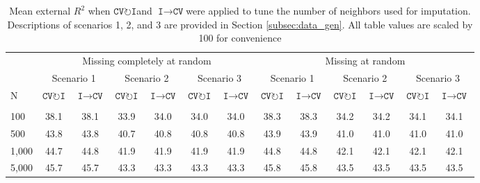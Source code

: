 \documentclass[AMA,STIX1COL,doublespace]{WileyNJD-v2}
\begin{document}
\begin{table}

\caption{\label{tab:tune}Mean external $R^2$ when $\texttt{CV}\!\circlearrowright\!\texttt{I}$\space and $\texttt{I}\!\!\rightarrow\!\texttt{CV}$\space were applied to tune the number of neighbors used for imputation. Descriptions of scenarios 1, 2, and 3 are provided in Section \ref{subsec:data_gen}. All table values are scaled by 100 for convenience}
\centering
\begin{tabular}[t]{lcccccccccccc}
\toprule
\multicolumn{1}{c}{ } & \multicolumn{6}{c}{Missing completely at random} & \multicolumn{6}{c}{Missing at random} \\
\cmidrule(l{3pt}r{3pt}){2-7} \cmidrule(l{3pt}r{3pt}){8-13}
\multicolumn{1}{c}{ } & \multicolumn{2}{c}{Scenario 1} & \multicolumn{2}{c}{Scenario 2} & \multicolumn{2}{c}{Scenario 3} & \multicolumn{2}{c}{Scenario 1} & \multicolumn{2}{c}{Scenario 2} & \multicolumn{2}{c}{Scenario 3} \\
\cmidrule(l{3pt}r{3pt}){2-3} \cmidrule(l{3pt}r{3pt}){4-5} \cmidrule(l{3pt}r{3pt}){6-7} \cmidrule(l{3pt}r{3pt}){8-9} \cmidrule(l{3pt}r{3pt}){10-11} \cmidrule(l{3pt}r{3pt}){12-13}
N & $\texttt{CV}\!\circlearrowright\!\texttt{I}$& $\texttt{I}\!\!\rightarrow\!\texttt{CV}$& $\texttt{CV}\!\circlearrowright\!\texttt{I}$& $\texttt{I}\!\!\rightarrow\!\texttt{CV}$& $\texttt{CV}\!\circlearrowright\!\texttt{I}$& $\texttt{I}\!\!\rightarrow\!\texttt{CV}$& $\texttt{CV}\!\circlearrowright\!\texttt{I}$& $\texttt{I}\!\!\rightarrow\!\texttt{CV}$& $\texttt{CV}\!\circlearrowright\!\texttt{I}$& $\texttt{I}\!\!\rightarrow\!\texttt{CV}$& $\texttt{CV}\!\circlearrowright\!\texttt{I}$& $\texttt{I}\!\!\rightarrow\!\texttt{CV}$\\
\midrule
\addlinespace[0.75em]
\multicolumn{13}{l}{\textbf{10 predictors, 10 junk}}\\
\hline
\hspace{1em}100 & 38.1 & 38.1 & 33.9 & 34.0 & 34.0 & 34.0 & 38.3 & 38.3 & 34.2 & 34.2 & 34.1 & 34.1\\
\hspace{1em}500 & 43.8 & 43.8 & 40.7 & 40.8 & 40.8 & 40.8 & 43.9 & 43.9 & 41.0 & 41.0 & 41.0 & 41.0\\
\hspace{1em}1,000 & 44.7 & 44.8 & 41.9 & 41.9 & 41.9 & 41.9 & 44.8 & 44.8 & 42.1 & 42.1 & 42.1 & 42.1\\
\hspace{1em}5,000 & 45.7 & 45.7 & 43.3 & 43.3 & 43.3 & 43.3 & 45.8 & 45.8 & 43.5 & 43.5 & 43.5 & 43.5\\

\end{tabular}
\end{table}
\end{document}
